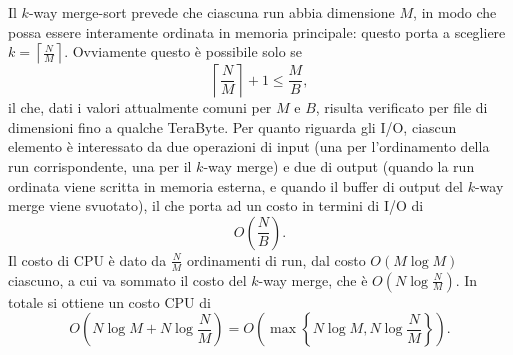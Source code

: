 \[\]
Il $k$-way merge-sort prevede che ciascuna run abbia dimensione $M$, in modo che possa essere interamente ordinata in memoria principale: questo porta a scegliere $k=\left\lceil\frac{N}{M}\right\rceil$. Ovviamente questo è possibile solo se \[\left\lceil\frac{N}{M}\right\rceil + 1 \le \frac{M}{B},\] il che, dati i valori attualmente comuni per $M$ e $B$, risulta verificato per file di dimensioni fino a qualche TeraByte.\newline
Per quanto riguarda gli I/O, ciascun elemento è interessato da due operazioni di input (una per l'ordinamento della run corrispondente, una per il $k$-way merge) e due di output (quando la run ordinata viene scritta in memoria esterna, e quando il buffer di output del $k$-way merge viene svuotato), il che porta ad un costo in termini di I/O di \[O\left(\frac{N}{B}\right).\] \newline
Il costo di CPU è dato da $\frac{N}{M}$ ordinamenti di run, dal costo $O(M \log M)$ ciascuno, a cui va sommato il costo del $k$-way merge, che è $O(N\log\frac{N}{M})$. In totale si ottiene un costo CPU di \[O\left(N\log M + N\log\frac{N}{M}\right) = O\left(\max\left\{N\log M, N\log\frac{N}{M}\right\}\right).\]

